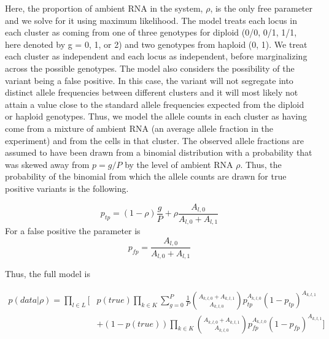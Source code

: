 \par{
Here, the proportion of ambient RNA in the system, $\rho$, is the only free parameter and we solve for it using maximum likelihood. The model treats each locus in each cluster as coming from one of three genotypes for diploid (0/0, 0/1, 1/1, here denoted by g = 0, 1, or 2) and two genotypes from haploid (0, 1). We treat each cluster as independent and each locus as independent, before marginalizing across the possible genotypes. The model also considers the possibility of the variant being a false positive. In this case, the variant will not segregate into distinct allele frequencies between different clusters and it will most likely not attain a value close to the standard allele frequencies expected from the diploid or haploid genotypes. Thus, we model the allele counts in each cluster as having come from a mixture of ambient RNA (an average allele fraction in the experiment) and from the cells in that cluster. The observed allele fractions are assumed to have been drawn from a binomial distribution with a probability that was skewed away from $p = g/P$ by the level of ambient RNA $\rho$. Thus, the probability of the binomial from which the allele counts are drawn for true positive variants is the following.
}



\begin{equation}
p_{tp} = (1-\rho)\frac{g}{P} + \rho \frac{A_{l,0}}{A_{l,0}+A_{l,1}}
\end{equation}
For a false positive the parameter is
\begin{equation}
p_{fp} = \frac{A_{l,0}}{A_{l,0} + A_{l,1}}
\end{equation}

Thus, the full model is


\begin{equation}
\begin{split}
p(data | \rho) = \prod_{l \in L} \bigg[ & p(true) \prod_{k \in K} \sum_{g = 0}^P \frac{1}{P} \binom{A_{k,l,0} + A_{k,l,1}}{A_{k,l,0}} p_{tp}^{A_{k,l,0}} (1-p_{tp})^{A_{k,l,1}} \\
 & + (1-p(true))\prod_{k \in K}\binom{A_{k,l,0} + A_{k,l,1}}{A_{k,l,0}}p_{fp}^{A_{k,l,0}} (1-p_{fp})^{A_{k,l,1}}  \bigg]
\end{split}
\end{equation}

